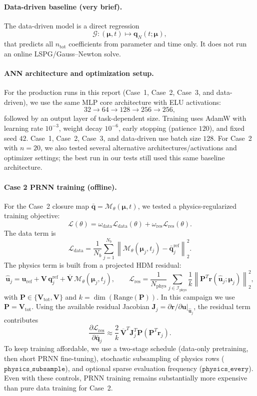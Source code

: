\documentclass[11pt]{article}
\begin{document}
\paragraph{Data-driven baseline (very brief).}
The data-driven model is a direct regression
\[
\mathcal G:(\bm\mu,t)\mapsto \mathbf q_N(t;\bm\mu),
\]
that predicts all $n_{\mathrm{tot}}$ coefficients from parameter and time only. It does not run an online LSPG/Gauss--Newton solve.

\paragraph{ANN architecture and optimization setup.}
For the production runs in this report (Case~1, Case~2, Case~3, and data-driven), we use the same MLP core architecture with ELU activations:
\[
32 \rightarrow 64 \rightarrow 128 \rightarrow 256 \rightarrow 256,
\]
followed by an output layer of task-dependent size. Training uses AdamW with learning rate $10^{-3}$, weight decay $10^{-6}$, early stopping (patience $120$), and fixed seed $42$.
Case~1, Case~2, Case~3, and data-driven use batch size $128$.
For Case~2 with $n=20$, we also tested several alternative architectures/activations and optimizer settings; the best run in our tests still used this same baseline architecture.

\paragraph{Case 2 PRNN training (offline).}
For the Case~2 closure map $\bar{\mathbf q}=\mathcal M_\theta(\bm\mu,t)$, we tested a physics-regularized training objective:
\[
\mathcal L(\theta)=\omega_{\mathrm{data}}\mathcal L_{\mathrm{data}}(\theta)+\omega_{\mathrm{res}}\mathcal L_{\mathrm{res}}(\theta).
\]
The data term is
\[
\mathcal L_{\mathrm{data}}
=
\frac{1}{N_b}\sum_{j=1}^{N_b}
\left\|
\mathcal M_\theta(\bm\mu_j,t_j)-\bar{\mathbf q}^{\mathrm{ref}}_j
\right\|_2^2.
\]
The physics term is built from a projected HDM residual:
\[
\widehat{\mathbf u}_j
=
\mathbf u_{\mathrm{ref}}+\mathbf V\,\mathbf q^{\mathrm{ref}}_j
+\overline{\mathbf V}\,\mathcal M_\theta(\bm\mu_j,t_j),\qquad
\mathcal L_{\mathrm{res}}
=
\frac{1}{N_{\mathrm{phys}}}\sum_{j\in\mathcal I_{\mathrm{phys}}}
\frac{1}{k}
\left\|
\mathbf P^T\mathbf r(\widehat{\mathbf u}_j;\bm\mu_j)
\right\|_2^2,
\]
with $\mathbf P\in\{\mathbf V_{\mathrm{tot}},\mathbf V\}$ and $k=\dim(\mathrm{Range}(\mathbf P))$. In this campaign we use $\mathbf P=\mathbf V_{\mathrm{tot}}$.
Using the available residual Jacobian $\mathbf J_j=\partial \mathbf r/\partial \mathbf u|_{\widehat{\mathbf u}_j}$, the residual term contributes
\[
\frac{\partial \mathcal L_{\mathrm{res}}}{\partial \bar{\mathbf q}_j}
\approx
\frac{2}{k}\,
\overline{\mathbf V}^{T}\mathbf J_j^{T}\mathbf P\left(\mathbf P^T\mathbf r_j\right).
\]
To keep training affordable, we use a two-stage schedule (data-only pretraining, then short PRNN fine-tuning), stochastic subsampling of physics rows ($\texttt{physics\_subsample}$), and optional sparse evaluation frequency ($\texttt{physics\_every}$). Even with these controls, PRNN training remains substantially more expensive than pure data training for Case~2.
\end{document}
